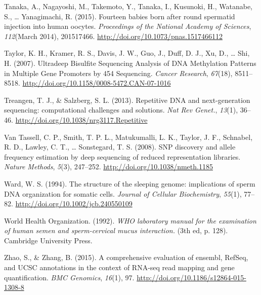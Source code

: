 \documentclass[12pt,twoside]{reedthesis}
\theoremstyle{definition}
\theoremstyle{definition}
\theoremstyle{remark}
\begin{document}
  \hypertarget{ref-Tanaka2015}{}
  Tanaka, A., Nagayoshi, M., Takemoto, Y., Tanaka, I., Kusunoki, H.,
  Watanabe, S., \ldots{} Yanagimachi, R. (2015). Fourteen babies born
  after round spermatid injection into human oocytes. \emph{Proceedings of
  the National Academy of Sciences}, \emph{112}(March 2014), 201517466.
  \url{http://doi.org/10.1073/pnas.1517466112}
  
  \hypertarget{ref-Taylor2007}{}
  Taylor, K. H., Kramer, R. S., Davis, J. W., Guo, J., Duff, D. J., Xu,
  D., \ldots{} Shi, H. (2007). Ultradeep Bisulfite Sequencing Analysis of
  DNA Methylation Patterns in Multiple Gene Promoters by 454 Sequencing.
  \emph{Cancer Research}, \emph{67}(18), 8511--8518.
  \url{http://doi.org/10.1158/0008-5472.CAN-07-1016}
  
  \hypertarget{ref-Treangen2013}{}
  Treangen, T. J., \& Salzberg, S. L. (2013). Repetitive DNA and
  next-generation sequencing: computational challenges and solutions.
  \emph{Nat Rev Genet.}, \emph{13}(1), 36--46.
  \url{http://doi.org/10.1038/nrg3117.Repetitive}
  
  \hypertarget{ref-VanTassell2008}{}
  Van Tassell, C. P., Smith, T. P. L., Matukumalli, L. K., Taylor, J. F.,
  Schnabel, R. D., Lawley, C. T., \ldots{} Sonstegard, T. S. (2008). SNP
  discovery and allele frequency estimation by deep sequencing of reduced
  representation libraries. \emph{Nature Methods}, \emph{5}(3), 247--252.
  \url{http://doi.org/10.1038/nmeth.1185}
  
  \hypertarget{ref-Ward1994}{}
  Ward, W. S. (1994). The structure of the sleeping genome: implications
  of sperm DNA organization for somatic cells. \emph{Journal of Cellular
  Biochemistry}, \emph{55}(1), 77--82.
  \url{http://doi.org/10.1002/jcb.240550109}
  
  \hypertarget{ref-WorldHealthOrganization1992}{}
  World Health Organization. (1992). \emph{WHO laboratory manual for the
  examination of human semen and sperm-cervical mucus interaction.} (3th
  ed, p. 128). Cambridge University Press.
  
  \hypertarget{ref-Zhao2015}{}
  Zhao, S., \& Zhang, B. (2015). A comprehensive evaluation of ensembl,
  RefSeq, and UCSC annotations in the context of RNA-seq read mapping and
  gene quantification. \emph{BMC Genomics}, \emph{16}(1), 97.
  \url{http://doi.org/10.1186/s12864-015-1308-8}


\end{document}
